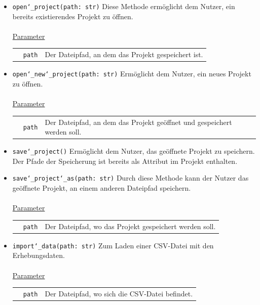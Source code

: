 \documentclass{article}
\begin{document}
\begin{itemize}
\item \texttt{open\char`_project(path: str)} \newline Diese Methode ermöglicht dem Nutzer, ein bereits existierendes Projekt zu öffnen.
\\\\
\underline{{Parameter}}\\
\begin{tabular}{lll}
 & \texttt{path} & Der Dateipfad, an dem das Projekt gespeichert ist. \\
\end{tabular}

\item \texttt{open\char`_new\char`_project(path: str)} \newline Ermöglicht dem Nutzer, ein neues Projekt zu öffnen.
\\\\
\underline{{Parameter}}\\
\begin{tabular}{lll}
 & \texttt{path} & Der Dateipfad, an dem das Projekt geöffnet und gespeichert werden soll. \\
\end{tabular}

\item \texttt{save\char`_project()} \newline Ermöglicht dem Nutzer, das geöffnete Projekt zu speichern. Der Pfade der Speicherung ist bereits als Attribut im Projekt enthalten.


\item \texttt{save\char`_project\char`_as(path: str)} \newline Durch diese Methode kann der Nutzer das geöffnete Projekt, an einem anderen Dateipfad speichern.
\\\\
\underline{{Parameter}}\\
\begin{tabular}{lll}
 & \texttt{path} & Der Dateipfad, wo das Projekt gespeichert werden soll. \\
\end{tabular}


\item \texttt{import\char`_data(path: str)} \newline Zum Laden einer CSV-Datei mit den Erhebungsdaten.
\\\\
\underline{{Parameter}}\\
\begin{tabular}{lll}
 & \texttt{path} & Der Dateipfad, wo sich die CSV-Datei befindet.\\
\end{tabular}



\end{itemize}
\end{document}
